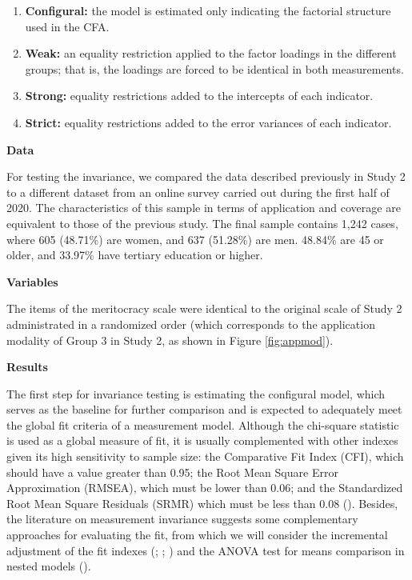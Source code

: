 \documentclass[
  10pt,
  a4paper,
]{article}
\begin{document}
\begin{enumerate}
\def\labelenumi{\arabic{enumi}.}
\item
  \textbf{Configural:} the model is estimated only indicating the factorial structure used in the CFA.
\item
  \textbf{Weak:} an equality restriction applied to the factor loadings in the different groups; that is, the loadings are forced to be identical in both measurements.
\item
  \textbf{Strong:} equality restrictions added to the intercepts of each indicator.
\item
  \textbf{Strict:} equality restrictions added to the error variances of each indicator.
\end{enumerate}

\textbf{Data}

For testing the invariance, we compared the data described previously in Study 2 to a different dataset from an online survey carried out during the first half of 2020. The characteristics of this sample in terms of application and coverage are equivalent to those of the previous study. The final sample contains 1,242 cases, where 605 (48.71\%) are women, and 637 (51.28\%) are men. 48.84\% are 45 or older, and 33.97\% have tertiary education or higher.

\textbf{Variables}

The items of the meritocracy scale were identical to the original scale of Study 2 administrated in a randomized order (which corresponds to the application modality of Group 3 in Study 2, as shown in Figure \ref{fig:appmod}).

\textbf{Results}

The first step for invariance testing is estimating the configural model, which serves as the baseline for further comparison and is expected to adequately meet the global fit criteria of a measurement model. Although the chi-square statistic is used as a global measure of fit, it is usually complemented with other indexes given its high sensitivity to sample size: the Comparative Fit Index (CFI), which should have a value greater than 0.95; the Root Mean Square Error Approximation (RMSEA), which must be lower than 0.06; and the Standardized Root Mean Square Residuals (SRMR) which must be less than 0.08 (). Besides, the literature on measurement invariance suggests some complementary approaches for evaluating the fit, from which we will consider the incremental adjustment of the fit indexes (; ; ) and the ANOVA test for means comparison in nested models ().
\end{document}
